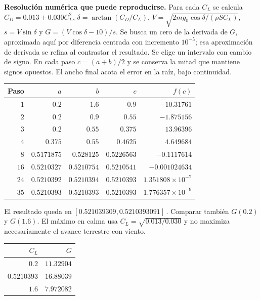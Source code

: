 \textbf{Resolución numérica que puede reproducirse.} Para cada $C_L$ se calcula $C_D=0.013+0.030C_L^2$, $\delta=\arctan(C_D/C_L)$, $V=\sqrt{2mg_0\cos\delta/(\rho SC_L)}$, $s=V\sin\delta$ y $G=(V\cos\delta-10)/s$. Se busca un cero de la derivada de $G$, aproximada aquí por diferencia centrada con incremento $10^{-5}$; esa aproximación de derivada se refina al contrastar el resultado. Se elige un intervalo con cambio de signo. En cada paso $c=(a+b)/2$ y se conserva la mitad que mantiene signos opuestos. El ancho final acota el error en la raíz, bajo continuidad.
\begin{center}\begin{tabular}{rrrrr}
\toprule Paso & $a$ & $b$ & $c$ & $f(c)$\\\midrule
$1$ & $0.2$ & $1.6$ & $0.9$ & $-10.31761$\\
$2$ & $0.2$ & $0.9$ & $0.55$ & $-1.875156$\\
$3$ & $0.2$ & $0.55$ & $0.375$ & $13.96396$\\
$4$ & $0.375$ & $0.55$ & $0.4625$ & $4.649684$\\
$8$ & $0.5171875$ & $0.528125$ & $0.5226563$ & $-0.1117614$\\
$16$ & $0.5210327$ & $0.5210754$ & $0.5210541$ & $-0.001024634$\\
$24$ & $0.5210392$ & $0.5210394$ & $0.5210393$ & $1.351808\times10^{-7}$\\
$35$ & $0.5210393$ & $0.5210393$ & $0.5210393$ & $1.776357\times10^{-9}$\\
\bottomrule\end{tabular}\end{center}
El resultado queda en $[0.521039309,0.5210393091]\,$. Comparar también $G(0.2)$ y $G(1.6)$. El máximo en calma usa $C_L=\sqrt{0.013/0.030}$ y no maximiza necesariamente el avance terrestre con viento.
\begin{center}\begin{tabular}{rr}
\toprule $C_L$ & $G$\\\midrule
$0.2$ & $11.32904$\\
$0.5210393$ & $16.88039$\\
$1.6$ & $7.972082$\\
\bottomrule\end{tabular}\end{center}